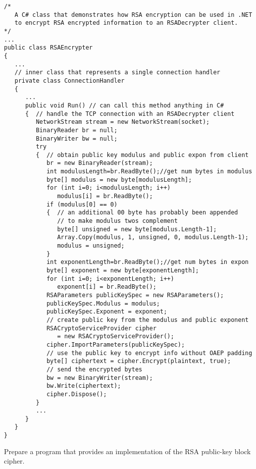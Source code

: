 \begin{figure*}\begin{program}\begin{verbatim}
/*
   A C# class that demonstrates how RSA encryption can be used in .NET
   to encrypt RSA encrypted information to an RSADecrypter client.
*/
...
public class RSAEncrypter
{
   ...
   // inner class that represents a single connection handler
   private class ConnectionHandler
   {
      ...
      public void Run() // can call this method anything in C#
      {  // handle the TCP connection with an RSADecrypter client
         NetworkStream stream = new NetworkStream(socket);
         BinaryReader br = null;
         BinaryWriter bw = null;
         try
         {  // obtain public key modulus and public expon from client
            br = new BinaryReader(stream);
            int modulusLength=br.ReadByte();//get num bytes in modulus
            byte[] modulus = new byte[modulusLength];
            for (int i=0; i<modulusLength; i++)
               modulus[i] = br.ReadByte();
            if (modulus[0] == 0)
            {  // an additional 00 byte has probably been appended
               // to make modulus twos complement
               byte[] unsigned = new byte[modulus.Length-1];
               Array.Copy(modulus, 1, unsigned, 0, modulus.Length-1);
               modulus = unsigned;
            }
            int exponentLength=br.ReadByte();//get num bytes in expon
            byte[] exponent = new byte[exponentLength];
            for (int i=0; i<exponentLength; i++)
               exponent[i] = br.ReadByte();
            RSAParameters publicKeySpec = new RSAParameters();
            publicKeySpec.Modulus = modulus;
            publicKeySpec.Exponent = exponent;
            // create public key from the modulus and public exponent
            RSACryptoServiceProvider cipher
               = new RSACryptoServiceProvider();
            cipher.ImportParameters(publicKeySpec);
            // use the public key to encrypt info without OAEP padding
            byte[] ciphertext = cipher.Encrypt(plaintext, true);
            // send the encrypted bytes
            bw = new BinaryWriter(stream);
            bw.Write(ciphertext);
            cipher.Dispose();
         }
         ...
      }
   }
}
\end{verbatim}\end{program}\end{figure*}


\begin{exercise}
Prepare a program that provides an implementation of the RSA public-key block cipher.
\end{exercise}



